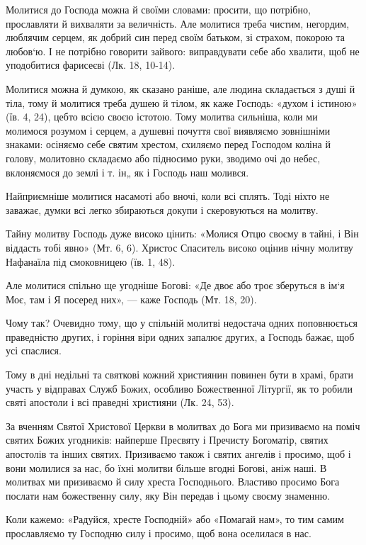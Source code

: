 \documentclass[main.tex]{subfiles}
\begin{document}
Молитися до Господа можна й своїми словами: просити, що потрібно, прославляти й вихваляти за величність. Але молитися треба чистим, негордим, люблячим серцем, як добрий син перед своїм батьком, зі страхом, покорою та любов`ю. І не потрібно говорити зайвого: виправдувати себе або хвалити, щоб не уподобитися фарисеєві (Лк. 18, 10-14).

Молитися можна й думкою, як сказано раніше, але людина складається з душі й тіла, тому й молитися треба душею й тілом, як каже Господь: «духом і істиною» (їв. 4, 24), цебто всією своєю істотою. Тому молитва сильніша, коли ми молимося розумом і серцем, а душевні почуття свої виявляємо зовнішніми знаками: осіняємо себе святим хрестом, схиляємо перед Господом коліна й голову, молитовно складаємо або підносимо руки, зводимо очі до небес, вклоняємося до землі і т. ін„ як і Господь наш молився.

Найприємніше молитися насамоті або вночі, коли всі сплять. Тоді ніхто не заважає, думки всі легко збираються докупи і скеровуються на молитву.

Тайну молитву Господь дуже високо цінить: «Молися Отцю своєму в тайні, і Він віддасть тобі явно» (Мт. 6, 6). Христос Спаситель високо оцінив нічну молитву Нафанаїла під смоковницею (їв. 1, 48).

Але молитися спільно ще угодніше Богові: «Де двоє або троє зберуться в ім`я Моє, там і Я посеред них», — каже Господь (Мт. 18, 20).

Чому так? Очевидно тому, що у спільній молитві недостача одних поповнюється праведністю других, і горіння віри одних запалює других, а Господь бажає, щоб усі спаслися.

Тому в дні недільні та святкові кожний християнин повинен бути в храмі, брати участь у відправах Служб Божих, особливо Божественної Літургії, як то робили святі апостоли і всі праведні християни (Лк. 24, 53).

За вченням Святої Христової Церкви в молитвах до Бога ми призиваємо на поміч святих Божих угодників: найперше Пресвяту і Пречисту Богоматір, святих апостолів та інших святих. Призиваємо також і святих ангелів і просимо, щоб і вони молилися за нас, бо їхні молитви більше вгодні Богові, аніж наші. В молитвах ми призиваємо й силу хреста Господнього. Властиво просимо Бога послати нам божественну силу, яку Він передав і цьому своєму знаменню.

Коли кажемо: «Радуйся, хресте Господній» або «Помагай нам», то тим самим прославляємо ту Господню силу і просимо, щоб вона оселилася в нас.
\end{document}
